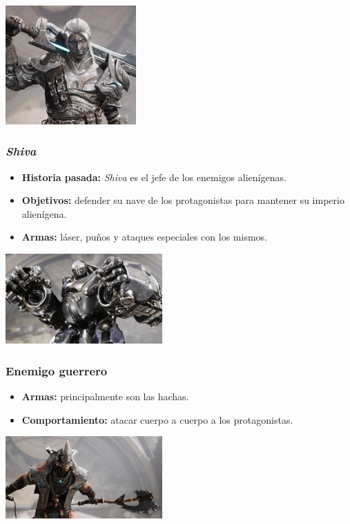 \documentclass[11pt, twoside]{article}
\begin{document}
\begin{center}
\includegraphics[width=5cm]{./images/euronymous.jpg}
\end{center}

\subsubsection{\textit{Shiva}}
\begin{itemize}
\item \textbf{Historia pasada:} \textit{Shiva} es el jefe de los enemigos alienígenas.
\item \textbf{Objetivos:} defender su nave de los protagonistas para mantener su imperio alienígena.
\item \textbf{Armas:} láser, puños y ataques especiales con los mismos. 
\end{itemize}

\begin{center}
\includegraphics[width=6cm]{./images/shiva.jpg}
\end{center}

\subsubsection{Enemigo guerrero}
\begin{itemize}
\item \textbf{Armas:} principalmente son las hachas.
\item \textbf{Comportamiento:} atacar cuerpo a cuerpo a los protagonistas.
\end{itemize}

\begin{center}
\includegraphics[width=6cm]{./images/guerrero.jpg}
\end{center}
\end{document}
